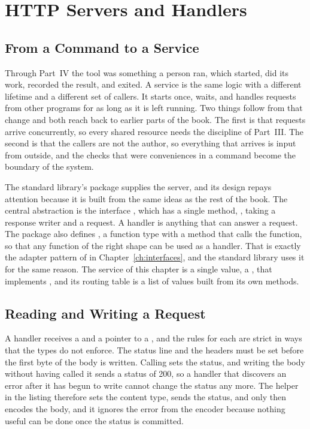 \chapter{HTTP Servers and Handlers}
\label{ch:http}

\section{From a Command to a Service}

Through Part~IV the tool was something a person ran, which started, did its work, recorded the result, and exited. A service is the same logic with a different lifetime and a different set of callers. It starts once, waits, and handles requests from other programs for as long as it is left running. Two things follow from that change and both reach back to earlier parts of the book. The first is that requests arrive concurrently, so every shared resource needs the discipline of Part~III. The second is that the callers are not the author, so everything that arrives is input from outside, and the checks that were conveniences in a command become the boundary of the system.

The standard library's  package supplies the server, and its design repays attention because it is built from the same ideas as the rest of the book. The central abstraction is the interface , which has a single method, , taking a response writer and a request. A handler is anything that can answer a request. The package also defines , a function type with a  method that calls the function, so that any function of the right shape can be used as a handler. That is exactly the adapter pattern of  in Chapter~\ref{ch:interfaces}, and the standard library uses it for the same reason. The service of this chapter is a single value, a , that implements , and its routing table is a list of  values built from its own methods.


\section{Reading and Writing a Request}

A handler receives a  and a pointer to a , and the rules for each are strict in ways that the types do not enforce. The status line and the headers must be set before the first byte of the body is written. Calling  sets the status, and writing the body without having called it sends a status of 200, so a handler that discovers an error after it has begun to write cannot change the status any more. The helper  in the listing therefore sets the content type, sends the status, and only then encodes the body, and it ignores the error from the encoder because nothing useful can be done once the status is committed.

